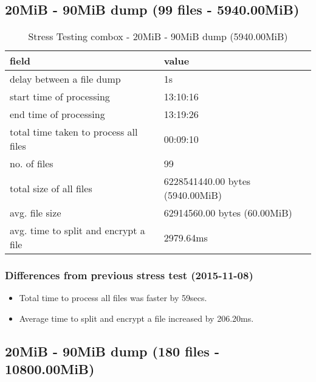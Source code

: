 \subsection{20MiB - 90MiB dump (99 files -
  5940.00MiB)}\label{4-st-5940}

\begin{center}
  \begin{table}[h]
    \begin{tabular}{ll}
      field & value\\
      \hline
      delay between a file dump & 1s\\
      start time of processing & 13:10:16\\
      end time of processing & 13:19:26\\
      total time taken to process all files & 00:09:10\\
      no. of files & 99\\
      total size of all files & 6228541440.00 bytes (5940.00MiB)\\
      avg. file size & 62914560.00 bytes (60.00MiB)\\
      avg. time to split and encrypt a file & 2979.64ms\\
    \end{tabular}
    \caption{Stress Testing combox - 20MiB - 90MiB dump (5940.00MiB)}
  \end{table}
\end{center}

\subsubsection{Differences from previous stress test (2015-11-08)}

\begin{itemize}
\item Total time to process all files was faster by 59secs.
\item Average time to split and encrypt a file increased by 206.20ms.
\end{itemize}

\subsection{20MiB - 90MiB dump (180 files -
  10800.00MiB)}\label{4-st-10800}

